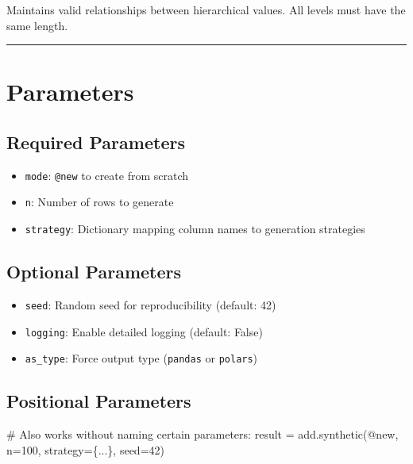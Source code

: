 \documentclass[
  letterpaper,
]{scrbook}
\newenvironment{Shaded}{\begin{snugshade}}{\end{snugshade}}
\newcommand{\CommentTok}[1]{\textcolor[rgb]{0.37,0.37,0.37}{#1}}
\newcommand{\DecValTok}[1]{\textcolor[rgb]{0.68,0.00,0.00}{#1}}
\newcommand{\NormalTok}[1]{\textcolor[rgb]{0.00,0.23,0.31}{#1}}
\newcommand{\OperatorTok}[1]{\textcolor[rgb]{0.37,0.37,0.37}{#1}}
\newcommand{\StringTok}[1]{\textcolor[rgb]{0.13,0.47,0.30}{#1}}
\providecommand{\tightlist}{%
  \setlength{\itemsep}{0pt}\setlength{\parskip}{0pt}}
\begin{document}
Maintains valid relationships between hierarchical values. All levels
must have the same length.

\begin{center}\rule{0.5\linewidth}{0.5pt}\end{center}

\section{Parameters}\label{parameters}

\subsection{Required Parameters}\label{required-parameters}

\begin{itemize}
\tightlist
\item
  \texttt{mode}: \texttt{\textquotesingle{}@new\textquotesingle{}} to
  create from scratch
\item
  \texttt{n}: Number of rows to generate
\item
  \texttt{strategy}: Dictionary mapping column names to generation
  strategies
\end{itemize}

\subsection{Optional Parameters}\label{optional-parameters}

\begin{itemize}
\tightlist
\item
  \texttt{seed}: Random seed for reproducibility (default: 42)
\item
  \texttt{logging}: Enable detailed logging (default: False)
\item
  \texttt{as\_type}: Force output type
  (\texttt{\textquotesingle{}pandas\textquotesingle{}} or
  \texttt{\textquotesingle{}polars\textquotesingle{}})
\end{itemize}

\subsection{Positional Parameters}\label{positional-parameters}

\begin{Shaded}
\begin{Highlighting}[]
\CommentTok{\# Also works without naming certain parameters:}
\NormalTok{result }\OperatorTok{=}\NormalTok{ add.synthetic(}\StringTok{\textquotesingle{}@new\textquotesingle{}}\NormalTok{, n}\OperatorTok{=}\DecValTok{100}\NormalTok{, strategy}\OperatorTok{=}\NormalTok{\{...\}, seed}\OperatorTok{=}\DecValTok{42}\NormalTok{)}
\end{Highlighting}
\end{Shaded}
\end{document}
